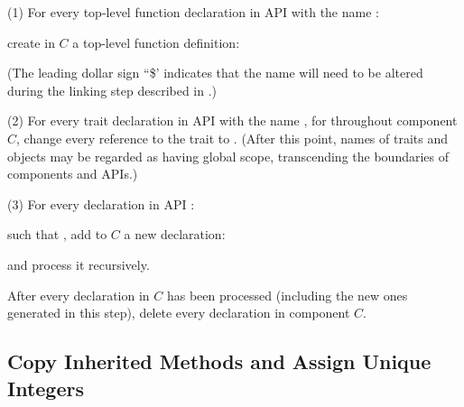 (1) For every top-level function declaration in API  with the name :
\begin{codeexamplesize}
\begin{tabbing}
\end{tabbing}
\end{codeexamplesize}
create in $C$ a top-level function definition:
\begin{codeexamplesize}
\begin{tabbing}
\end{tabbing}
\end{codeexamplesize}
(The leading dollar sign ``\$' indicates that the name  will
need to be altered during the linking step described in .)

(2) For every trait declaration in API  with the name ,
for throughout component $C$, change every reference to the trait  to .
(After this point, names of traits and objects may be regarded as having global scope,
transcending the boundaries of components and APIs.)

(3) For every  declaration in API :
\begin{codeexamplesize}
\begin{tabbing}
\end{tabbing}
\end{codeexamplesize}
such that , add to $C$ a new  declaration:
\begin{codeexamplesize}
\begin{tabbing}
\end{tabbing}
\end{codeexamplesize}
and process it recursively.

After every  declaration in $C$ has been processed
(including the new ones generated in this step),
delete every  declaration in component $C$.


\subsection{Copy Inherited Methods and Assign Unique Integers}

